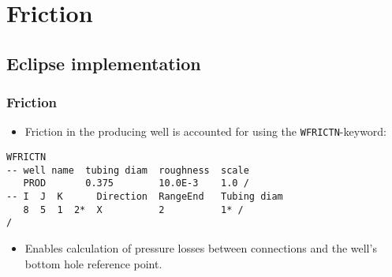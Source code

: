 \section{Friction}

\subsection{Eclipse implementation}
\begin{frame}[fragile]
    \frametitle{Friction}
    \begin{itemize}
        \item Friction in the producing well is accounted for using the \texttt{WFRICTN}-keyword:
    \end{itemize}

\vspace{1em}

    \begin{code}
        \begin{verbatim}
WFRICTN
-- well name  tubing diam  roughness  scale
   PROD       0.375        10.0E-3    1.0 /
-- I  J  K      Direction  RangeEnd   Tubing diam
   8  5  1  2*  X          2          1* /
/
        \end{verbatim}
    \end{code}

    \begin{itemize}
        \item Enables calculation of pressure losses between connections and the well's bottom hole reference point.
    \end{itemize}

\end{frame}


